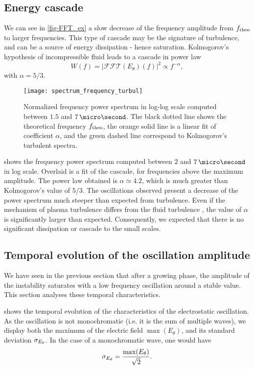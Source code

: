   \subsection{Energy cascade} \label{subsec-turbul}
  
    We can see in \cref{fig-FFT_ex} a slow decrease of the frequency amplitude from $f_{\rm theo}$ to larger frequencies.
    This type of cascade may be the signature of turbulence, and can be a source of energy dissipation - hence saturation.
    Kolmogorov's hypothesis of incompressible fluid leads to a cascade in power law \[ W(f) = | \mathcal{FFT}(E_{\theta})(f) |^2 \propto f ^ {- \alpha}, \]
    with $\alpha = 5/3$.
    \begin{figure}[!hbt]
      \centering
      \texttt{[image: spectrum\_frequency\_turbul]}
      \caption{Normalized frequency power spectrum in log-log scale computed between $1.5$ and $7\,\micro\second$. The black dotted line shows the  theoretical frequency $f_{\rm theo}$, the orange solid line is a linear fit of coefficient $\alpha$, and the green dashed line correspond to Kolmogorov's turbulent spectra. }
      \label{fig-turbul}
    \end{figure}
    
     shows the frequency power spectrum computed between $2$ and $7\,\micro\second$ in log scale.
    Overlaid is a fit of the cascade, for frequencies above the maximum amplitude.
    The power law obtained is $\alpha \simeq 4.2$, which is much greater than Kolmogorov's value of $5/3$.
    The oscillations observed present a decrease of the power spectrum much steeper than expected from turbulence.
    Even if the mechanism of plasma turbulence differs from the fluid turbulence \citep{tsytovich1972}, the value of $\alpha$ is significantly larger than expected.
    Consequently, we expected that there is no significant dissipation or cascade to the small scales.
  
  \subsection{Temporal evolution of the oscillation amplitude} \label{subsec-temp}
    We have seen in the previous section that after a growing phase, the amplitude of the instability saturates with a low frequency oscillation around a stable value.
    This section analyses these temporal characteristics.
    
     shows the temporal evolution of the characteristics of the electrostatic oscillation.
    As the oscillation is not monochromatic (i.e. it is the sum of multiple waves), we display both the maximum of the electric field $\max(E_{\theta})$, and its standard deviation $\sigma_{E_{\theta}}$.
    In the case of a monochromatic wave, one would have 
    \[ \sigma_{E_{\theta}} = \frac{\max(E_{\theta})}{\sqrt{2}}.  \]
    
